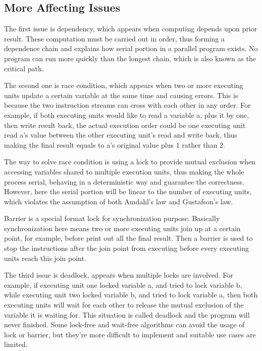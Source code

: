 \documentclass[12pt,a4paper]{report}
\begin{document}
\subsection{More Affecting Issues}

The first issue is dependency, which appears when computing depends upon prior result. These computation must be carried out in order, thus forming a dependence chain and explains how serial portion in a parallel program exists. No program can run more quickly than the longest chain, which is also known as the critical path.

The second one is race condition, which appears when two or more executing units update a certain variable at the same time and causing errors. This is because the two instruction streams can cross with each other in any order. For example, if both executing units would like to read a variable a, plus it by one, then write result back, the actual execution order could be one executing unit read a's value between the other executing unit's read and write back, thus making the final result equals to a's original value plus 1 rather than 2.

The way to solve race condition is using a lock to provide mutual exclusion when accessing variables shared to multiple execution units, thus making the whole process serial, behaving in a deterministic way and guarantee the correctness. However, here the serial portion will be linear to the number of executing units, which violates the assumption of both Amdahl's law and Gustafson's law.

Barrier is a special format lock for synchronization purpose. Basically synchronization here means two or more executing units join up at a certain point, for example, before print out all the final result. Then a barrier is used to stop the instructions after the join point from executing before every executing units reach this join point.

The third issue is deadlock, appears when multiple locks are involved. For example, if executing unit one locked variable a, and tried to lock variable b, while executing unit two locked variable b, and tried to lock variable a, then both executing units will wait for each other to release the mutual exclusion of the variable it is waiting for. This situation is called deadlock and the program will never finished. Some lock-free and wait-free algorithms can avoid the usage of lock or barrier, but they're more difficult to implement and suitable use cases are limited.
\end{document}
